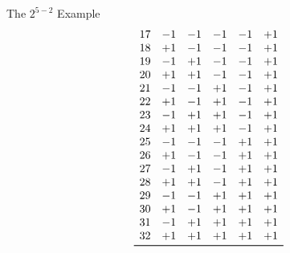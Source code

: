\begin{itemize}
\begin{Example}{The $ 2^{5-2} $ Example}{}
\[\begin{array}{cccccc}
                              17               & -1              & -1              & -1              & -1              & +1              \\
                              18               & +1              & -1              & -1              & -1              & +1              \\
                              19               & -1              & +1              & -1              & -1              & +1              \\
                              20               & +1              & +1              & -1              & -1              & +1              \\
                              21               & -1              & -1              & +1              & -1              & +1              \\
                              22               & +1              & -1              & +1              & -1              & +1              \\
                              23               & -1              & +1              & +1              & -1              & +1              \\
                              24               & +1              & +1              & +1              & -1              & +1              \\
                              25               & -1              & -1              & -1              & +1              & +1              \\
                              26               & +1              & -1              & -1              & +1              & +1              \\
                              27               & -1              & +1              & -1              & +1              & +1              \\
                              28               & +1              & +1              & -1              & +1              & +1              \\
                              29               & -1              & -1              & +1              & +1              & +1              \\
                              30               & +1              & -1              & +1              & +1              & +1              \\
                              31               & -1              & +1              & +1              & +1              & +1              \\
                              32               & +1              & +1              & +1              & +1              & +1              \\
                              \bottomrule
                        \end{array} \]
            \end{Example}
\end{itemize}
